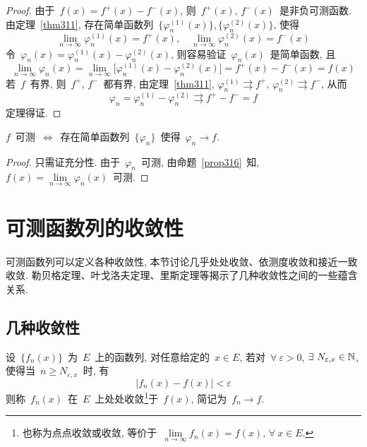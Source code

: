 \begin{proof}
由于~$f(x) = f^+(x) - f^-(x)$, 则~$f^+(x),\,f^-(x)$~是非负可测函数. 由定理~\ref{thm311}, 存在简单函数列~$\{\varphi^{(1)}_n(x)\}, \{\varphi^{(2)}_n(x)\}$, 使得
\[
\lim_{n \to \infty} \varphi^{(1)}_n(x) = f^+(x), \quad \lim_{n \to \infty} \varphi^{(2)}_n(x) = f^-(x)
\]
令~$\varphi_n(x) = \varphi^{(1)}_n(x) - \varphi^{(2)}_n(x)$, 则容易验证~$\varphi_n(x)$~是简单函数, 且
\[
\lim_{n \to \infty} \varphi_n(x) = \lim_{n \to \infty} \big[\varphi^{(1)}_n(x) - \varphi^{(2)}_n(x) \big] = f^+(x) - f^-(x) = f(x)
\]
若~$f$~有界, 则~$f^+, \, f^-$~都有界, 由定理~\ref{thm311}, $\varphi^{(1)}_n \rightrightarrows f^+, \, \varphi^{(2)}_n \rightrightarrows f^-$, 从而
\[
\varphi_n = \varphi^{(1)}_n - \varphi^{(2)}_n \rightrightarrows f^+ - f^- = f
\]
定理得证.
\end{proof}

\begin{corollary}
$f$~可测~$\Leftrightarrow$~存在简单函数列~$\{ \varphi_n\}$~使得~$\varphi_n \rightarrow f$.
\end{corollary}

\begin{proof}
只需证充分性. 由于~$\varphi_n$~可测, 由命题~\ref{prop316}~知, $f(x) = \lim\limits_{n \to \infty} \varphi_n(x)$~可测.
\end{proof}

\section{可测函数列的收敛性}

可测函数列可以定义各种收敛性, 本节讨论几乎处处收敛、依测度收敛和接近一致收敛. 勒贝格定理、叶戈洛夫定理、里斯定理等揭示了几种收敛性之间的一些蕴含关系.

\subsection{几种收敛性}

\begin{definition}
设~$\{f_n(x)\}$~为~$E$~上的函数列, 对任意给定的~$x \in E$, 若对~$\forall~\varepsilon > 0$, $\exists~N_{\varepsilon,x} \in \mathbb{N}$, 使得当~$n \geqslant N_{\varepsilon,x}$~时, 有
\[
|f_n(x) - f(x)| < \varepsilon
\]
则称~$f_n(x)$~在~$E$~上处处收敛\footnote{也称为点点收敛或收敛, 等价于~$\lim\limits_{n \to \infty} f_n(x) = f(x), \, \forall~x \in E$.}于~$f(x)$, 简记为~$f_n \rightarrow f$.
\end{definition}

